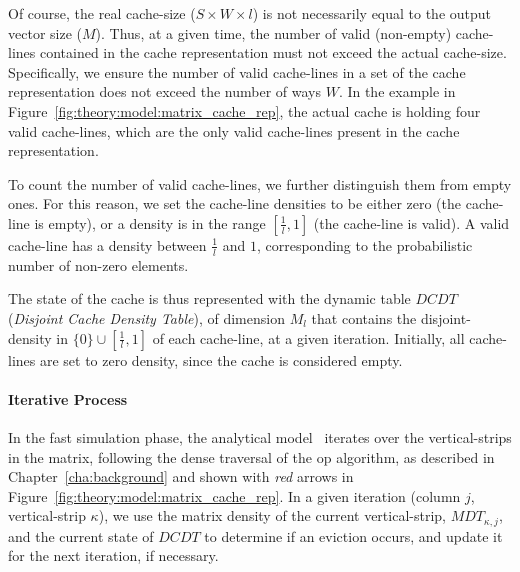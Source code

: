 Of course, the real cache-size ($S \times W \times l$) is not necessarily equal to the output vector size ($M$).
Thus, at a given time, the number of valid (non-empty) cache-lines contained in the cache representation must not exceed the actual cache-size.
Specifically, we ensure the number of valid cache-lines in a \gls{set} of the cache representation does not exceed the number of ways $W$.
In the example in Figure~\ref{fig:theory:model:matrix_cache_rep}, the actual cache is holding four valid cache-lines, which are the only valid cache-lines present in the cache representation.

To count the number of valid cache-lines, we further distinguish them from empty ones.
For this reason, we set the cache-line densities to be either zero (the cache-line is empty), or a density is in the range $\left[\frac{1}{l}, 1\right]$ (the cache-line is valid).
A valid cache-line has a density between $\frac{1}{l}$ and $1$, corresponding to the probabilistic number of non-zero elements.

The state of the cache is thus represented with the dynamic table $\mathit{DCDT}$ (\textit{Disjoint Cache Density Table}), of dimension $M_l$ that contains the disjoint-density in $\{0\} \cup \left[\frac{1}{l}, 1\right]$ of each cache-line, at a given iteration.
Initially, all cache-lines are set to zero density, since the cache is considered empty.

\paragraph{Iterative Process}
In the fast simulation phase, the analytical model~\cite{FRIEDENTHAL2012_AnalyticalModel} iterates over the vertical-strips in the matrix, following the dense traversal of the \acrshort{op} algorithm, as described in Chapter~\ref{cha:background} and shown with \textit{red} arrows in Figure~\ref{fig:theory:model:matrix_cache_rep}.
In a given iteration (column $j$, vertical-strip $\kappa$), we use the matrix density of the current vertical-strip, $\mathit{MDT}_{\kappa,j}$, and the current state of $\mathit{DCDT}$ to determine if an \gls{eviction} occurs, and update it for the next iteration, if necessary.


